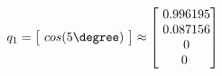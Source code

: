 \documentclass[preview]{standalone}
\begin{document}
\begin{center}
$q_1 = \begin{bmatrix}\
                    cos(5 \degree) \
                \end{bmatrix} \approx \begin{bmatrix}\
                    0.996195 \\\
                    0.087156 \\\
                    0 \\\
                    0\
                \end{bmatrix}$
\end{center}
\end{document}
